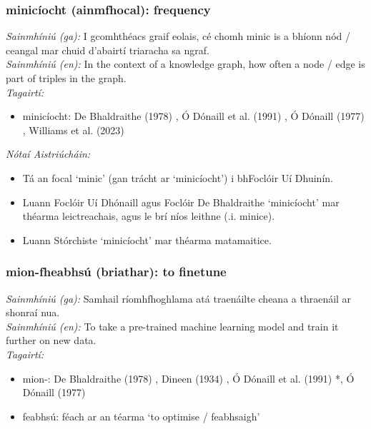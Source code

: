 \documentclass{article}
\begin{document}
\subsubsection*{minicíocht (ainmfhocal): frequency}
 \noindent \textit{Sainmhíniú (ga):} I gcomhthéacs graif eolais, cé chomh minic is a bhíonn nód / ceangal mar chuid d'abairtí triaracha sa ngraf.
\\
 \noindent \textit{Sainmhíniú (en):} In the context of a knowledge graph, how often a node / edge is part of triples in the graph.
\\
 \noindent \textit{Tagairtí:}
\begin{itemize}
	\item minicíocht: De Bhaldraithe (1978) \cite{de-bhaldraithe}, Ó Dónaill et al. (1991) \cite{focloir-beag}, Ó Dónaill (1977) \cite{odonaill}, Williams et al. (2023) \cite{storchiste}
\end{itemize}

 \noindent \textit{Nótaí Aistriúcháin:}
\begin{itemize}
	\item Tá an focal `minic' (gan trácht ar `minicíocht') i bhFoclóir Uí Dhuinín.
	\item Luann Foclóir Uí Dhónaill agus Foclóir De Bhaldraithe `minicíocht' mar théarma leictreachais, agus le brí níos leithne (.i. minice).
	\item Luann Stórchiste `minicíocht' mar théarma matamaitice.
\end{itemize}


\subsubsection*{mion-fheabhsú (briathar): to finetune}
 \noindent \textit{Sainmhíniú (ga):} Samhail ríomhfhoghlama atá traenáilte cheana a thraenáil ar shonraí nua.
\\
 \noindent \textit{Sainmhíniú (en):} To take a pre-trained machine learning model and train it further on new data.
\\
 \noindent \textit{Tagairtí:}
\begin{itemize}
	\item mion-: De Bhaldraithe (1978) \cite{de-bhaldraithe}, Dineen (1934) \cite{dineen}, Ó Dónaill et al. (1991) \cite{focloir-beag}*, Ó Dónaill (1977) \cite{odonaill}
	\item feabhsú: féach ar an téarma `to optimise / feabhsaigh'
\end{itemize}
\end{document}
